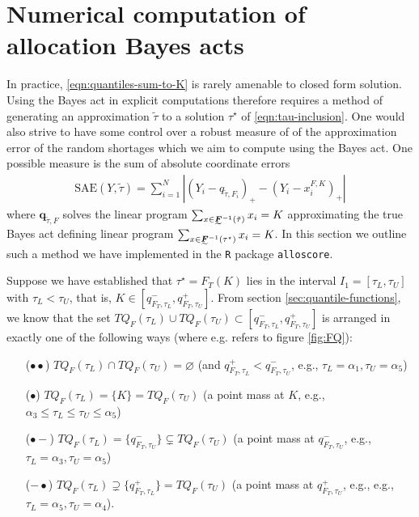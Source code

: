 \documentclass{article}
\begin{document}
\section{Numerical computation of allocation Bayes acts}
\label{sec:numeric}

In practice, \eqref{eqn:quantiles-sum-to-K} is rarely amenable to closed form solution.
Using the Bayes act in explicit computations therefore requires a method of generating an approximation $\tilde{\tau}$ to 
a solution $\tau^{\star}$ of \eqref{eqn:tau-inclusion}.  One would also strive to have some control over a robust measure of 
of the approximation error of the random shortages which we aim to compute using the Bayes act. One possible measure is the sum
of absolute coordinate errors
\begin{align}
\mathrm{SAE}(Y,\tilde{\tau}) = \sum_{i=1}^{N} \left| (Y_i-q_{\tilde{\tau},F_i})_+ - (Y_i-x_i^{F,K})_+ \right|
\end{align}
where $\bm{q}_{\tilde{\tau},F}$ solves the linear program
$\sum_{x \in \undertilde{\bm{F}}^{-1}(\tilde{\tau})}x_i = K$ approximating the true Bayes act defining linear program
$\sum_{x \in \undertilde{\bm{F}}^{-1}(\tau^{\star})}x_i = K$. In this section we outline such a method we have implemented 
in the \verb`R` package \verb`alloscore`.

Suppose we have established that $\tau^{\star} = F_T(K)$ lies in the interval $I_1 = [\tau_L, \tau_U]$ with $\tau_L < \tau_U$,
that is, $K \in [q^{-}_{F_T,\tau_L}, q^{+}_{F_T,\tau_U}]$.
From section \ref{sec:quantile-functions}, we know that the set 
$TQ_F(\tau_L) \cup TQ_F(\tau_U) \subset [q^{-}_{F_T,\tau_L}, q^{+}_{F_T,\tau_U}]$
is arranged in exactly one of the following ways (where e.g. refers to figure \ref{fig:FQ}): 
\begin{itemize}
\item[($\bullet \bullet$)] $TQ_F(\tau_L) \cap TQ_F(\tau_U) = \varnothing$ 
(and $q^{+}_{F_T,\tau_L} < q^{-}_{F_T,\tau_U}$, e.g., $\tau_L=\alpha_1, \tau_U=\alpha_5$)
\item[($\bullet$)] $TQ_F(\tau_L) = \{K\} = TQ_F(\tau_U)$ 
(a point mass at $K$, e.g., $\alpha_3 \leq \tau_L \leq \tau_U \leq \alpha_5$)
\item[($\bullet\!-$)] $TQ_F(\tau_L) = \{q^{-}_{F_T,\tau_U}\} \subsetneq TQ_F(\tau_U)$ 
(a point mass at $q^{-}_{F_T,\tau_U}$, e.g., $\tau_L = \alpha_3, \tau_U = \alpha_5$)
\item[($-\!\bullet$)] $TQ_F(\tau_L) \supsetneq \{q^{+}_{F_T,\tau_L}\} = TQ_F(\tau_U)$ 
(a point mass at $q^{+}_{F_T,\tau_U}$, e.g., e.g., $\tau_L = \alpha_5, \tau_U = \alpha_4$).
\end{itemize}
 
\end{document}
